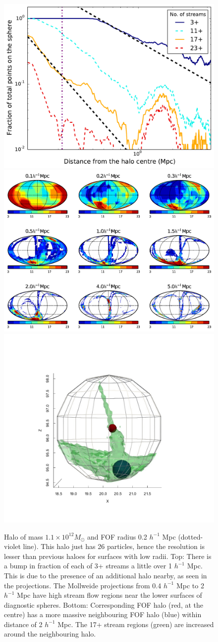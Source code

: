 \begin{figure}
\begin{minipage}[t]{.99\linewidth}
  \centering\includegraphics[width=10.cm]{Chapter3/Source_v2/fig10a}
\includegraphics[width=10.cm]{Chapter3/Source_v2/fig10b}
\includegraphics[width=6.cm]{Chapter3/Source_v2/fig10c}
\end{minipage}\hfill
\caption{Halo of mass $1.1 \times 10^{12} M_{\odot} $  and FOF radius 0.2 $h^{-1}$ Mpc (dotted-violet line). This halo just has 26 particles, hence the resolution is lesser than previous haloes for surfaces with low radii. Top: There is a bump in fraction of each of 3+ streams a little over 1 $h^{-1}$ Mpc. This is due to the presence of an additional halo nearby, as seen in the projections. The Mollweide projections from 0.4 $h^{-1}$ Mpc to 2 $h^{-1}$ Mpc have high stream flow regions near the lower surfaces of diagnostic spheres. Bottom: Corresponding FOF halo (red, at the centre) has a more massive neighbouring FOF halo (blue) within distance of 2 $h^{-1}$ Mpc. The 17+ stream regions (green) are increased around the neighbouring halo.} 
\label{fig:4322}
\end{figure}


